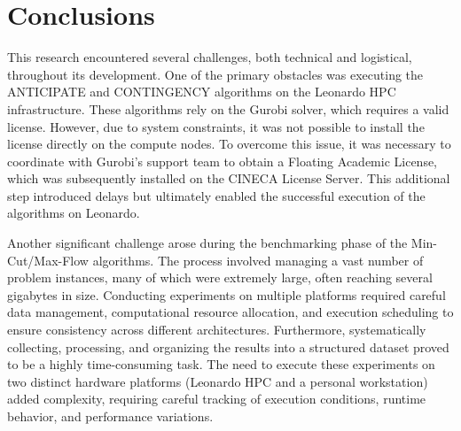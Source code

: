 \documentclass[a4paper,singleside,12pt]{report} %
\begin{document}
\chapter{Conclusions}

This research encountered several challenges, both technical and logistical, throughout its development. One of the primary obstacles was executing the ANTICIPATE and CONTINGENCY 
algorithms on the Leonardo HPC infrastructure. These algorithms rely on the Gurobi solver, which requires a valid license. However, due to system constraints, it was not possible to 
install the license directly on the compute nodes. To overcome this issue, it was necessary to coordinate with Gurobi's support team to obtain a Floating Academic License, which was 
subsequently installed on the CINECA License Server. This additional step introduced delays but ultimately enabled the successful execution of the algorithms on Leonardo.

Another significant challenge arose during the benchmarking phase of the Min-Cut/Max-Flow algorithms. The process involved managing a vast number of problem instances, many of which 
were extremely large, often reaching several gigabytes in size. Conducting experiments on multiple platforms required careful data management, computational resource allocation, and 
execution scheduling to ensure consistency across different architectures. Furthermore, systematically collecting, processing, and organizing the results into a structured dataset 
proved to be a highly time-consuming task. The need to execute these experiments on two distinct hardware platforms (Leonardo HPC and a personal workstation) added complexity, 
requiring careful tracking of execution conditions, runtime behavior, and performance variations.
\end{document}
